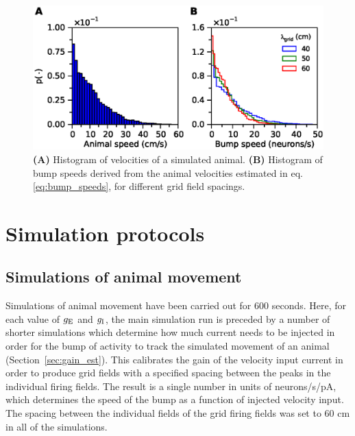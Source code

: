 \documentclass[a4paper,12pt]{article}
\newcommand{\ssc}[3]{\ensuremath{#1_{\text{#2}_{\text{#3}}}}}
\newcommand{\gE      }{\ssc{g}      {\scriptsize{E}}{}}
\newcommand{\gI      }{\ssc{g}      {\scriptsize{I}}{}}
\begin{document}
\renewcommand{\figurename}{Supplementary Methods Figure}
\begin{figure}[th]
    \begin{center}
        \includegraphics[trim=0 0.6cm 0 0 ]{fig/velocity_histograms}
    \end{center}
    \internallinenumbers
    \caption{\textbf{(A)} Histogram of velocities of a simulated animal.
    \textbf{(B)} Histogram of bump speeds derived from the animal velocities
    estimated in eq. \eqref{eq:bump_speeds}, for different grid field spacings.}
    \label{fig:velocity_histograms}
\end{figure}


\section{Simulation protocols} \label{sec:noise_protocols}

\subsection{Simulations of animal movement} \label{sec:noise_grids_protocol}

Simulations of animal movement have been carried out for 600 seconds.  Here,
for each value of $\gE$ and $\gI$, the main simulation run is preceded by a
number of shorter simulations which determine how much current needs to be
injected in order for the bump of activity to track the simulated movement of
an animal (Section~\ref{sec:gain_est}). This calibrates the gain of the
velocity input current in order to produce grid fields with a specified spacing
between the peaks in the individual firing fields. The result is a single
number in units of neurons/s/pA, which determines the speed of the bump as a
function of injected velocity input. The spacing between the individual fields
of the grid firing fields was set to 60 cm in all of the simulations.
\end{document}
